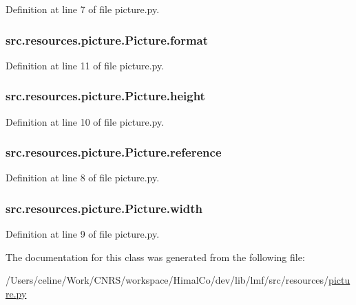 Definition at line 7 of file picture.\+py.

\hypertarget{classsrc_1_1resources_1_1picture_1_1_picture_afce02889d8db77869eee3103da6c46f5}{
\subsubsection[{format}]{\setlength{\rightskip}{0pt plus 5cm}src.\+resources.\+picture.\+Picture.\+format}}\label{classsrc_1_1resources_1_1picture_1_1_picture_afce02889d8db77869eee3103da6c46f5}


Definition at line 11 of file picture.\+py.

\hypertarget{classsrc_1_1resources_1_1picture_1_1_picture_a7648bd554fb274458f7cc32fa7c48e4a}{
\subsubsection[{height}]{\setlength{\rightskip}{0pt plus 5cm}src.\+resources.\+picture.\+Picture.\+height}}\label{classsrc_1_1resources_1_1picture_1_1_picture_a7648bd554fb274458f7cc32fa7c48e4a}


Definition at line 10 of file picture.\+py.

\hypertarget{classsrc_1_1resources_1_1picture_1_1_picture_a3eac2bc1d9a3bc1f85b441e16719a4b7}{
\subsubsection[{reference}]{\setlength{\rightskip}{0pt plus 5cm}src.\+resources.\+picture.\+Picture.\+reference}}\label{classsrc_1_1resources_1_1picture_1_1_picture_a3eac2bc1d9a3bc1f85b441e16719a4b7}


Definition at line 8 of file picture.\+py.

\hypertarget{classsrc_1_1resources_1_1picture_1_1_picture_ad9329b3048acfd8dacef0dfe9ca57ded}{
\subsubsection[{width}]{\setlength{\rightskip}{0pt plus 5cm}src.\+resources.\+picture.\+Picture.\+width}}\label{classsrc_1_1resources_1_1picture_1_1_picture_ad9329b3048acfd8dacef0dfe9ca57ded}


Definition at line 9 of file picture.\+py.



The documentation for this class was generated from the following file\+:\begin{DoxyCompactItemize}
\item 
/\+Users/celine/\+Work/\+C\+N\+R\+S/workspace/\+Himal\+Co/dev/lib/lmf/src/resources/\hyperlink{picture_8py}{picture.\+py}\end{DoxyCompactItemize}

